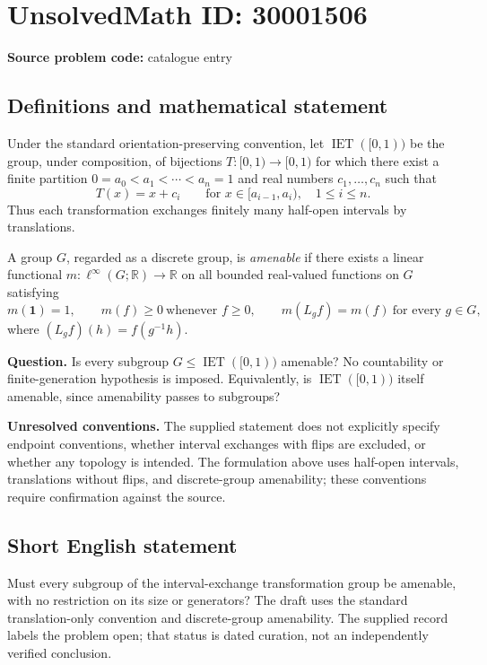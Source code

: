 \documentclass[11pt]{article}
\newcommand{\R}{\mathbb{R}}
\begin{document}
\section*{UnsolvedMath ID: 30001506}
\textbf{Source problem code:} catalogue entry
\subsection{Definitions and mathematical statement}
Under the standard orientation-preserving convention, let \(\operatorname{IET}([0,1))\) be the group, under composition, of bijections \(T:[0,1)\to[0,1)\) for which there exist a finite partition \(0=a_0<a_1<\cdots<a_n=1\) and real numbers \(c_1,\ldots,c_n\) such that
\[
T(x)=x+c_i\qquad\text{for }x\in[a_{i-1},a_i),\quad 1\leq i\leq n.
\]
Thus each transformation exchanges finitely many half-open intervals by translations.

A group \(G\), regarded as a discrete group, is \emph{amenable} if there exists a linear functional \(m:\ell^\infty(G;\R)\to\R\) on all bounded real-valued functions on \(G\) satisfying
\[
m(\mathbf{1})=1,\qquad m(f)\geq0\ \text{whenever }f\geq0,\qquad m(L_gf)=m(f)\ \text{for every }g\in G,
\]
where \((L_gf)(h)=f(g^{-1}h)\).

\textbf{Question.} Is every subgroup \(G\leq\operatorname{IET}([0,1))\) amenable? No countability or finite-generation hypothesis is imposed. Equivalently, is \(\operatorname{IET}([0,1))\) itself amenable, since amenability passes to subgroups?

\textbf{Unresolved conventions.} The supplied statement does not explicitly specify endpoint conventions, whether interval exchanges with flips are excluded, or whether any topology is intended. The formulation above uses half-open intervals, translations without flips, and discrete-group amenability; these conventions require confirmation against the source.
\subsection{Short English statement}
Must every subgroup of the interval-exchange transformation group be amenable, with no restriction on its size or generators? The draft uses the standard translation-only convention and discrete-group amenability. The supplied record labels the problem open; that status is dated curation, not an independently verified conclusion.
\end{document}
